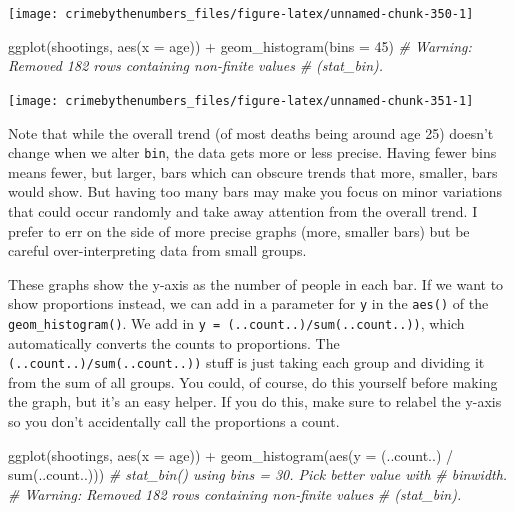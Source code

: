\documentclass[
]{krantz}
\makeatletter
\newenvironment{Shaded}{\begin{snugshade}}{\end{snugshade}}
\newcommand{\AttributeTok}[1]{\textcolor[rgb]{0.61,0.61,0.61}{#1}}
\newcommand{\CommentTok}[1]{\textcolor[rgb]{0.37,0.37,0.37}{\textit{#1}}}
\newcommand{\DecValTok}[1]{\textcolor[rgb]{0.06,0.06,0.06}{#1}}
\newcommand{\FunctionTok}[1]{\textcolor[rgb]{0,0,0}{#1}}
\newcommand{\NormalTok}[1]{#1}
\newcommand{\SpecialCharTok}[1]{\textcolor[rgb]{0,0,0}{#1}}
\newenvironment{kframe}{%
\medskip{}
\setlength{\fboxsep}{.8em}
 \def\at@end@of@kframe{}%
 \ifinner\ifhmode%
  \def\at@end@of@kframe{\end{minipage}}%
  \begin{minipage}{\columnwidth}%
 \fi\fi%
 \def\FrameCommand##1{\hskip\@totalleftmargin \hskip-\fboxsep
 \colorbox{shadecolor}{##1}\hskip-\fboxsep
     \hskip-\linewidth \hskip-\@totalleftmargin \hskip\columnwidth}%
 \MakeFramed {\advance\hsize-\width
   \@totalleftmargin\z@ \linewidth\hsize
   \@setminipage}}%
 {\par\unskip\endMakeFramed%
 \at@end@of@kframe}
\renewenvironment{Shaded}{\begin{kframe}}{\end{kframe}}
\makeatother
\begin{document}
\begin{center}\texttt{[image: crimebythenumbers\_files/figure-latex/unnamed-chunk-350-1]} \end{center}

\begin{Shaded}
\begin{Highlighting}[]
\FunctionTok{ggplot}\NormalTok{(shootings, }\FunctionTok{aes}\NormalTok{(}\AttributeTok{x =}\NormalTok{ age)) }\SpecialCharTok{+}
  \FunctionTok{geom\_histogram}\NormalTok{(}\AttributeTok{bins =} \DecValTok{45}\NormalTok{)}
\CommentTok{\# Warning: Removed 182 rows containing non{-}finite values}
\CommentTok{\# (stat\_bin).}
\end{Highlighting}
\end{Shaded}

\begin{center}\texttt{[image: crimebythenumbers\_files/figure-latex/unnamed-chunk-351-1]} \end{center}

Note that while the overall trend (of most deaths being
around age 25) doesn't change when we alter \texttt{bin},
the data gets more or less precise. Having fewer bins means
fewer, but larger, bars which can obscure trends that more,
smaller, bars would show. But having too many bars may make
you focus on minor variations that could occur randomly and
take away attention from the overall trend. I prefer to err
on the side of more precise graphs (more, smaller bars) but
be careful over-interpreting data from small groups.

These graphs show the y-axis as the number of people in each
bar. If we want to show proportions instead, we can add in a
parameter for \texttt{y} in the \texttt{aes()} of the
\texttt{geom\_histogram()}. We add in
\texttt{y\ =\ (..count..)/sum(..count..))}, which
automatically converts the counts to proportions. The
\texttt{(..count..)/sum(..count..))} stuff is just taking
each group and dividing it from the sum of all groups. You
could, of course, do this yourself before making the graph,
but it's an easy helper. If you do this, make sure to
relabel the y-axis so you don't accidentally call the
proportions a count.

\begin{Shaded}
\begin{Highlighting}[]
\FunctionTok{ggplot}\NormalTok{(shootings, }\FunctionTok{aes}\NormalTok{(}\AttributeTok{x =}\NormalTok{ age)) }\SpecialCharTok{+}
  \FunctionTok{geom\_histogram}\NormalTok{(}\FunctionTok{aes}\NormalTok{(}\AttributeTok{y =}\NormalTok{ (..count..) }\SpecialCharTok{/} \FunctionTok{sum}\NormalTok{(..count..)))}
\CommentTok{\# \textasciigrave{}stat\_bin()\textasciigrave{} using \textasciigrave{}bins = 30\textasciigrave{}. Pick better value with}
\CommentTok{\# \textasciigrave{}binwidth\textasciigrave{}.}
\CommentTok{\# Warning: Removed 182 rows containing non{-}finite values}
\CommentTok{\# (stat\_bin).}
\end{Highlighting}
\end{Shaded}
\end{document}
